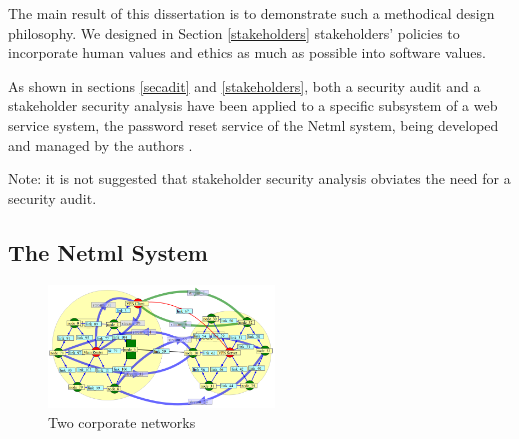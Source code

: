 The main result of this dissertation is to demonstrate such a methodical design philosophy. We designed in Section \ref{stakeholders} stakeholders' policies to incorporate human values and ethics as much as possible into software values.

As shown in sections \ref{secadit} and \ref{stakeholders}, both a security audit and a stakeholder security analysis have been applied to a specific subsystem of a web service system, the password reset service of the Netml system, being developed and managed by the authors \cite{sheniar2018experiments}.

Note: it is not suggested that stakeholder security analysis obviates
the need for a security audit.

\subsection{The Netml System}
\iffalse
\begin{figure}
	\centering
		\includegraphics[width=6cm]{figures/vpn.png}
\caption{Two corporate networks }
\label{corporatenetwork}
\end{figure}

